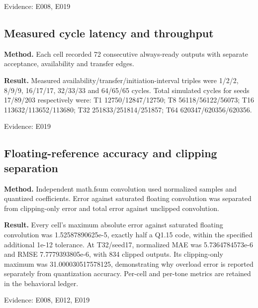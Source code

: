 \documentclass[11pt,a4paper]{article}
\begin{document}
{\small Evidence: E008,\allowbreak{} E019}

\subsection{Measured cycle latency and throughput}

\textbf{Method.} Each cell recorded 72 consecutive always-ready outputs with separate acceptance,\allowbreak{} availability and transfer edges.

\textbf{Result.} Measured availability/\allowbreak{}transfer/\allowbreak{}initiation-interval triples were 1/\allowbreak{}2/\allowbreak{}2,\allowbreak{} 8/\allowbreak{}9/\allowbreak{}9,\allowbreak{} 16/\allowbreak{}17/\allowbreak{}17,\allowbreak{} 32/\allowbreak{}33/\allowbreak{}33 and 64/\allowbreak{}65/\allowbreak{}65 cycles. Total simulated cycles for seeds 17/\allowbreak{}89/\allowbreak{}203 respectively were: T1 12750/\allowbreak{}12847/\allowbreak{}12750; T8 56118/\allowbreak{}56122/\allowbreak{}56073; T16 113632/\allowbreak{}113652/\allowbreak{}113680; T32 251833/\allowbreak{}251814/\allowbreak{}251857; T64 620347/\allowbreak{}620356/\allowbreak{}620356.

{\small Evidence: E019}

\subsection{Floating-reference accuracy and clipping separation}

\textbf{Method.} Independent math.fsum convolution used normalized samples and quantized coefficients. Error against saturated floating convolution was separated from clipping-only error and total error against unclipped convolution.

\textbf{Result.} Every cell's maximum absolute error against saturated floating convolution was 1.52587890625e-5,\allowbreak{} exactly half a Q1.15 code,\allowbreak{} within the specified additional 1e-12 tolerance. At T32/\allowbreak{}seed17,\allowbreak{} normalized MAE was 5.7364784573e-6 and RMSE 7.7779393805e-6,\allowbreak{} with 834 clipped outputs. Its clipping-only maximum was 31.000030517578125,\allowbreak{} demonstrating why overload error is reported separately from quantization accuracy. Per-cell and per-tone metrics are retained in the behavioral ledger.

{\small Evidence: E008,\allowbreak{} E012,\allowbreak{} E019}
\end{document}
